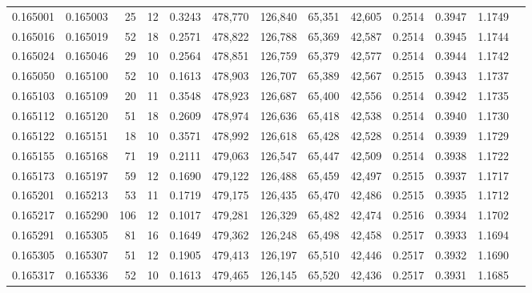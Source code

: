 \begin{tabular}{rrrrrrrrrrrrr}
0.165001 & 0.165003 &    25 &  12 &                                     0.3243 & 478,770 & 126,840 &  65,351 &  42,605 & 0.2514 & 0.3947 & 1.1749 \\
0.165016 & 0.165019 &    52 &  18 &                                     0.2571 & 478,822 & 126,788 &  65,369 &  42,587 & 0.2514 & 0.3945 & 1.1744 \\
0.165024 & 0.165046 &    29 &  10 &                                     0.2564 & 478,851 & 126,759 &  65,379 &  42,577 & 0.2514 & 0.3944 & 1.1742 \\
0.165050 & 0.165100 &    52 &  10 &                                     0.1613 & 478,903 & 126,707 &  65,389 &  42,567 & 0.2515 & 0.3943 & 1.1737 \\
0.165103 & 0.165109 &    20 &  11 &                                     0.3548 & 478,923 & 126,687 &  65,400 &  42,556 & 0.2514 & 0.3942 & 1.1735 \\
0.165112 & 0.165120 &    51 &  18 &                                     0.2609 & 478,974 & 126,636 &  65,418 &  42,538 & 0.2514 & 0.3940 & 1.1730 \\
0.165122 & 0.165151 &    18 &  10 &                                     0.3571 & 478,992 & 126,618 &  65,428 &  42,528 & 0.2514 & 0.3939 & 1.1729 \\
0.165155 & 0.165168 &    71 &  19 &                                     0.2111 & 479,063 & 126,547 &  65,447 &  42,509 & 0.2514 & 0.3938 & 1.1722 \\
0.165173 & 0.165197 &    59 &  12 &                                     0.1690 & 479,122 & 126,488 &  65,459 &  42,497 & 0.2515 & 0.3937 & 1.1717 \\
0.165201 & 0.165213 &    53 &  11 &                                     0.1719 & 479,175 & 126,435 &  65,470 &  42,486 & 0.2515 & 0.3935 & 1.1712 \\
0.165217 & 0.165290 &   106 &  12 &                                     0.1017 & 479,281 & 126,329 &  65,482 &  42,474 & 0.2516 & 0.3934 & 1.1702 \\
0.165291 & 0.165305 &    81 &  16 &                                     0.1649 & 479,362 & 126,248 &  65,498 &  42,458 & 0.2517 & 0.3933 & 1.1694 \\
0.165305 & 0.165307 &    51 &  12 &                                     0.1905 & 479,413 & 126,197 &  65,510 &  42,446 & 0.2517 & 0.3932 & 1.1690 \\
0.165317 & 0.165336 &    52 &  10 &                                     0.1613 & 479,465 & 126,145 &  65,520 &  42,436 & 0.2517 & 0.3931 & 1.1685 \\

\end{tabular}
